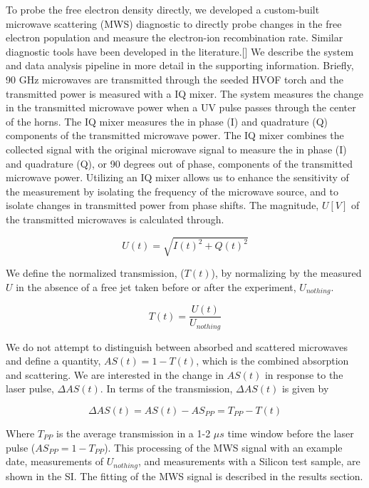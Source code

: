 To probe the free electron density directly, we developed a custom-built microwave scattering (MWS) diagnostic to directly probe changes in the free electron population and measure the electron-ion recombination rate. Similar diagnostic tools have been developed in the literature.[]  We describe the system and data analysis pipeline in more detail in the supporting information. Briefly, 90 GHz microwaves are transmitted through the seeded HVOF torch and the transmitted power is measured with a IQ mixer. The system measures the change in the transmitted microwave power when a UV pulse passes through the center of the horns.  The IQ mixer measures the in phase (I) and quadrature (Q) components of the transmitted microwave power. The IQ mixer combines the collected signal with the original microwave signal to measure the in phase (I) and quadrature (Q), or 90 degrees out of phase, components of the transmitted microwave power. Utilizing an IQ mixer allows us to enhance the sensitivity of the measurement by isolating the frequency of the microwave source, and to isolate changes in transmitted power from phase shifts. The magnitude, $U [V]$ of the transmitted microwaves is calculated through.

\begin{equation}
    U(t) = \sqrt{I(t)^2 + Q(t)^2}
\end{equation}

We define the normalized transmission, ($T(t)$), by normalizing by the measured $U$ in the absence of a free jet taken before or after the experiment, $U_{nothing}$. 

\begin{equation}
    \label{eq:transmission_def}
    T(t) = \frac{U(t)}{U_{nothing}}
\end{equation}

We do not attempt to distinguish between absorbed and scattered microwaves and define a quantity, $AS(t) = 1- T(t)$, which is the combined absorption and scattering. We are interested in the change in $AS(t)$ in response to the laser pulse, $\Delta AS(t)$. In terms of the transmission, $\Delta AS(t)$ is given by

\begin{equation}
    \Delta AS(t) = AS(t) - AS_{PP} =  T_{PP} - T(t)
\end{equation}

Where $T_{PP}$ is the average transmission in a 1-2 $\mu s$ time window before the laser pulse ($AS_{PP} = 1 - T_{PP}$). This processing of the MWS signal with an example date, measurements of $U_{nothing}$, and measurements with a Silicon test sample, are shown in the SI. The fitting of the MWS signal is described in the results section. 


